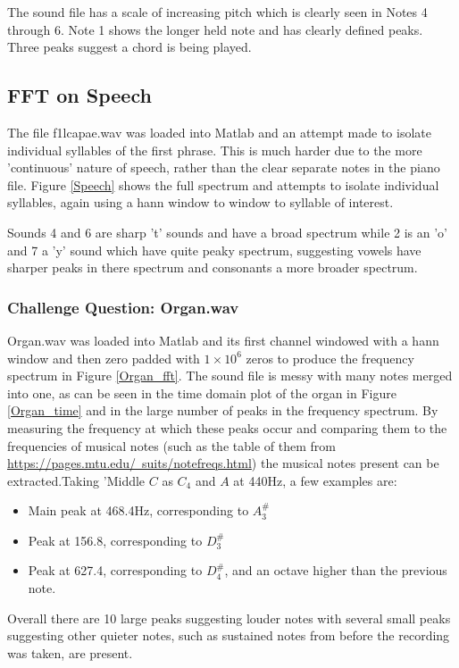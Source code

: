 \documentclass[10.9pt]{article}
\begin{document}
The sound file has a scale of increasing pitch which is clearly seen in Notes 4 through 6. Note 1 shows the longer held note and has clearly defined peaks. Three peaks suggest a chord is being played.
\subsection{FFT on Speech}
The file f1lcapae.wav  was loaded into Matlab and an attempt made to isolate individual syllables of the first phrase. This is much harder due to the more 'continuous' nature of speech, rather than the clear separate notes in the piano file. Figure \ref{Speech}  shows the full spectrum and attempts to isolate individual syllables, again using a hann window to window to syllable of interest.

Sounds 4 and 6 are sharp 't' sounds and have a broad spectrum while 2 is an 'o' and 7 a 'y' sound which have quite peaky spectrum, suggesting vowels have sharper peaks in there spectrum and consonants a more broader spectrum.


\subsubsection{Challenge Question: Organ.wav}
Organ.wav was loaded into Matlab and its first channel windowed with a hann window and then zero padded with $1 \times 10^6$ zeros to produce the frequency spectrum in Figure \ref{Organ_fft}. The sound file is messy with many notes merged into one, as can be seen in the time domain plot of the organ in Figure \ref{Organ_time} and in the large number of peaks in the frequency spectrum. By measuring the frequency at which these peaks occur and comparing them to the frequencies of musical notes (such as the table of them from \underline{https://pages.mtu.edu/~suits/notefreqs.html}) the musical notes present can be extracted.Taking 'Middle $C$ as $C_4$ and $A$ at 440Hz, a few examples are:

\begin{itemize}
\item Main peak at 468.4Hz, corresponding to $A_3^\#$
\item Peak at 156.8, corresponding to $D_3^\#$
\item Peak at 627.4, corresponding to $D_4^\#$, and an octave higher than the previous note.
\end{itemize}

Overall there are 10 large peaks suggesting louder notes with several small peaks suggesting other quieter notes, such as sustained notes from before the recording was taken, are present.
\end{document}
